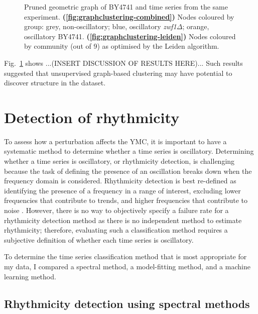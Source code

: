\begin{figure}[htbp]
  \caption{
    Pruned geometric graph of BY4741 and  time series from the same experiment.
    \textbf{(\ref{fig:graphclustering-combined})}
    Nodes coloured by group: grey, non-oscillatory; blue, oscillatory \textit{zwf1$\Delta$}; orange, oscillatory BY4741.
    \textbf{(\ref{fig:graphclustering-leiden})}
    Nodes coloured by community (out of 9) as optimised by the Leiden algorithm.
  }
  \label{fig:graphclustering}
\end{figure}

Fig.\ \ref{fig:graphclustering} shows ...(INSERT DISCUSSION OF RESULTS HERE)...
Such results suggested that unsupervised graph-based clustering may have potential to discover structure in the dataset.


\section{Detection of rhythmicity}
\label{sec:analysis-classification}

To assess how a perturbation affects the YMC, it is important to have a systematic method to determine whether a time series is oscillatory.
Determining whether a time series is oscillatory, or rhythmicity detection, is challenging because the task of defining the presence of an oscillation breaks down when the frequency domain is considered.
Rhythmicity detection is best re-defined as identifying the presence of a frequency in a range of interest, excluding lower frequencies that contribute to trends, and higher frequencies that contribute to noise \parencite{zielinskiStrengthsLimitationsPeriod2014}.
However, there is no way to objectively specify a failure rate for a rhythmicity detection method as there is no independent method to estimate rhythmicity; therefore, evaluating such a classification method requires a subjective definition of whether each time series is oscillatory.

To determine the time series classification method that is most appropriate for my data, I compared a spectral method, a model-fitting method, and a machine learning method.


\subsection{Rhythmicity detection using spectral methods}
\label{subsec:analysis-classification-spectral}

